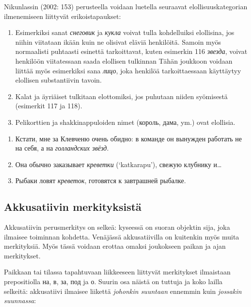 \documentclass[]{scrartcl}
\providecommand{\tightlist}{%
  \setlength{\itemsep}{0pt}\setlength{\parskip}{0pt}}
\begin{document}
Nikunlassin (2002: 153) perusteella voidaan luetella seuraavat
elollisuuskategorian ilmenemiseen liittyvät erikoistapaukset:

\begin{enumerate}
\def\labelenumi{\arabic{enumi}.}
\item
  Esimerkiksi sanat \emph{снеговик} ja \emph{кукла} voivat tulla
  kohdelluiksi elollisina, jos niihin viitataan ikään kuin ne olisivat
  eläviä henkilöitä. Samoin myös normaalisti puhtaasti esinettä
  tarkoittavat, kuten esimerkin 116 \emph{звезда}, voivat henkilöön
  viitatessaan saada elollisen tulkinnan Tähän joukkoon voidaan liittää
  myös esimerkiksi sana \emph{лицо}, joka henkilöä tarkoittaessaan
  käyttäytyy elollisen substantiivin tavoin.
\item
  Kalat ja äyriäiset tulkitaan elottomiksi, jos puhutaan niiden
  syömisestä (esimerkit 117 ja 118).
\item
  Pelikorttien ja shakkinappuloiden nimet (король, дама, ym.) ovat
  elollisia.
\end{enumerate}

\begin{enumerate}
\def\labelenumi{(\arabic{enumi})}
\setcounter{enumi}{115}
\tightlist
\item
  Кстати, мне за Клевченю очень обидно: в команде он вынужден работать
  не на себя, а на \emph{голландских звёзд}.
\item
  Она обычно заказывает \emph{креветки} (`katkarapu'), свежую клубнику
  и\ldots{}
\item
  Рыбаки ловят \emph{креветок}, готовятся к завтрашней рыбалке.
\end{enumerate}

\subsection{Akkusatiivin
merkityksistä}\label{akkusatiivin-merkityksistuxe4}

Akkusatiivin perusmerkitys on selkeä: kyseessä on suoran objektin sija,
joka ilmaisee toiminnan kohdetta. Venäjässä akkusatiivilla on kuitenkin
myös muita merkityksiä. Myös tässä voidaan erottaa omaksi joukokseen
paikan ja ajan merkitykset.

Paikkaan tai tilassa tapahtuvaan liikkeeseen liittyvät merkitykset
ilmaistaan prepositiolla на, в, за, под ja о. Suurin osa näistä on
tuttuja ja koko lailla selkeitä: akkusatiivi ilmaisee liikettä
\emph{johonkin suuntaan} ennemmin kuin \emph{jossakin suunnassa}:
\end{document}
